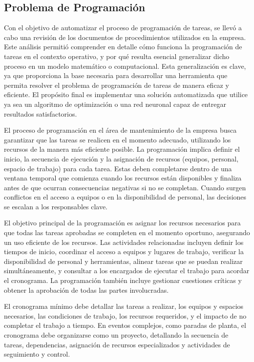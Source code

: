 \documentclass{article}
\begin{document}
\subsection{Problema de Programación}
Con el objetivo de automatizar el proceso de programación de tareas, se llevó a cabo una revisión de los documentos de procedimientos utilizados en la empresa. Este análisis permitió comprender en detalle cómo funciona la programación de tareas en el contexto operativo, y por qué resulta esencial generalizar dicho proceso en un modelo matemático o computacional. Esta generalización es clave, ya que proporciona la base necesaria para desarrollar una herramienta que permita resolver el problema de programación de tareas de manera eficaz y eficiente. El propósito final es implementar una solución automatizada que utilice ya sea un algoritmo de optimización o una red neuronal capaz de entregar resultados satisfactorios.

El proceso de programación en el área de mantenimiento de la empresa busca garantizar que las tareas se realicen en el momento adecuado, utilizando los recursos de la manera más eficiente posible. La programación implica definir el inicio, la secuencia de ejecución y la asignación de recursos (equipos, personal, espacio de trabajo) para cada tarea. Estas deben completarse dentro de una ventana temporal que comienza cuando los recursos están disponibles y finaliza antes de que ocurran consecuencias negativas si no se completan. Cuando surgen conflictos en el acceso a equipos o en la disponibilidad de personal, las decisiones se escalan a los responsables clave.

El objetivo principal de la programación es asignar los recursos necesarios para que todas las tareas aprobadas se completen en el momento oportuno, asegurando un uso eficiente de los recursos. Las actividades relacionadas incluyen definir los tiempos de inicio, coordinar el acceso a equipos y lugares de trabajo, verificar la disponibilidad de personal y herramientas, alinear tareas que se puedan realizar simultáneamente, y consultar a los encargados de ejecutar el trabajo para acordar el cronograma. La programación también incluye gestionar cuestiones críticas y obtener la aprobación de todas las partes involucradas.

El cronograma mínimo debe detallar las tareas a realizar, los equipos y espacios necesarios, las condiciones de trabajo, los recursos requeridos, y el impacto de no completar el trabajo a tiempo. En eventos complejos, como paradas de planta, el cronograma debe organizarse como un proyecto, detallando la secuencia de tareas, dependencias, asignación de recursos especializados y actividades de seguimiento y control.
\end{document}
